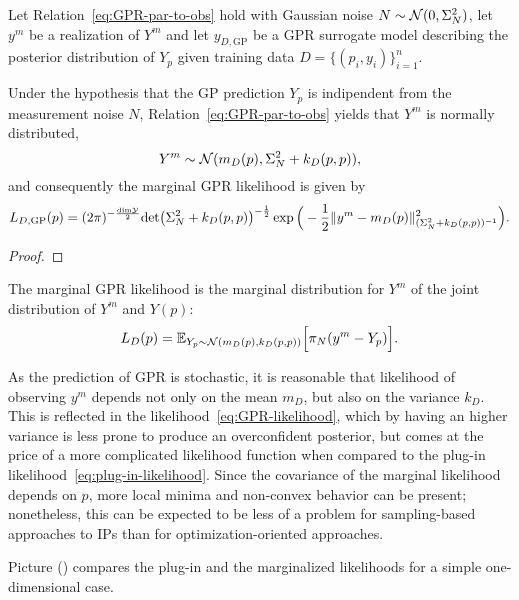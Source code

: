 \begin{prp}
    Let Relation~\eqref{eq:GPR-par-to-obs} hold with Gaussian noise $N \sim \mathcal N (0, \Sigma_N^2)$, let $y^m$ be a realization of $Y^m$ and let $y_{D, \text{GP}}$ be a GPR surrogate model describing the posterior distribution of $Y_p$ given training data $D = \{ (p_i, y_i) \}_{i=1}^n$.

    Under the hypothesis that the GP prediction $Y_p$ is indipendent from the measurement noise $N$, Relation~\eqref{eq:GPR-par-to-obs} yields that $Y^m$ is normally distributed,
    \[
    Y^m \sim \mathcal N(m_D(p), \Sigma_N^2 + k_D(p,p)), 
    \]
    and consequently the marginal GPR likelihood is given by
    \begin{equation}\label{eq:GPR-likelihood}
        L_{D, \text{GP}}(p) = (2\pi)^{-\frac{\text{dim} \mathcal Y}{2}} \text{det}\big ( \Sigma_N^2 + k_D(p, p) \big )^{-\frac{1}{2}} \exp \Big( -\frac{1}{2}\lVert y^m - m_D(p)\rVert_{(\Sigma_N^2 + k_D(p,p))^{-1}}^2 \Big ).
    \end{equation}
\end{prp}
\begin{proof}
\end{proof}
\begin{rmk}
    The marginal GPR likelihood is the marginal distribution for $Y^m$ of the joint distribution of $Y^m$ and $Y(p)$:
    \begin{equation*}
        L_{D}(p) =  \mathbb E_{Y_p \sim \mathcal N (m_D(p),k_D(p,p))} \Big [ \pi_N (y^m - Y_p) \Big ].
    \end{equation*}
\end{rmk}


As the prediction of GPR is stochastic, it is reasonable that likelihood of observing $y^m$ depends not only on the mean $m_D$, but also on the variance $k_D$. 
This is reflected in the likelihood~\eqref{eq:GPR-likelihood}, which by having an higher variance is less prone to produce an overconfident posterior, but comes at the price of a more complicated likelihood function when compared to the plug-in likelihood~\eqref{eq:plug-in-likelihood}.
Since the covariance of the marginal likelihood depends on $p$, more local minima and non-convex behavior can be present; nonetheless, this can be expected to be less of a problem for sampling-based approaches to IPs than for optimization-oriented approaches.

Picture () compares the plug-in and the marginalized likelihoods for a simple one-dimensional case.


